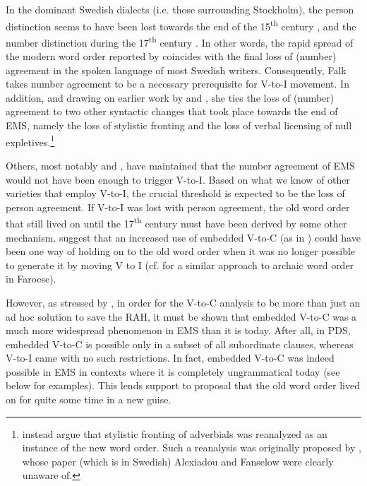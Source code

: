 \documentclass[output=paper]{langscibook}
\begin{document}
In the dominant Swedish dialects (i.e. those surrounding Stockholm), the person distinction seems to have been lost towards the end of the 15\textsuperscript{th} century \citep{Neuman1925}, and the number distinction during the 17\textsuperscript{th} century \citep{Larsson1988}. In other words, the rapid spread of the modern word order reported by \citet{Falk1993} coincides with the final loss of (number) agreement in the spoken language of most Swedish writers. Consequently, Falk takes number agreement to be a necessary prerequisite for V-to-I movement. In addition, and drawing on earlier work by \citet{Platzack1985} and \citet{PlatzackHolmberg1989}, she ties the loss of (number) agreement to two other syntactic changes that took place towards the end of EMS, namely the loss of stylistic fronting and the loss of verbal licensing of null expletives.\footnote{\citet{AlexiadouFanselow2002} instead argue that stylistic fronting of adverbials was reanalyzed as an instance of the new word order. Such a reanalysis was originally proposed by \citet{Pettersson1988}, whose paper (which is in Swedish) Alexiadou and Fanselow were clearly unaware of.} 



Others, most notably \citet{Rohrbacher1999} and \citet{KoenemanZeijlstra2014}, have maintained that the number agreement of EMS would not have been enough to trigger V-to-I. Based on what we know of other varieties that employ V-to-I, the crucial threshold is expected to be the loss of person agreement. If V-to-I was lost with person agreement, the old word order that still lived on until the 17\textsuperscript{th} century must have been derived by some other mechanism. \citet{KoenemanZeijlstra2014} suggest that an increased use of embedded V-to-C (as in ) could have been one way of holding on to the old word order when it was no longer possible to generate it by moving V to I (cf. \citealt{HeycockEtAl2010} for a similar approach to archaic word order in Faroese).



However, as stressed by \citet{Gartner2019}, in order for the V-to-C analysis to be more than just an ad hoc solution to save the RAH, it must be shown that embedded V-to-C was a much more widespread phenomenon in EMS than it is today. After all, in PDS, embedded V-to-C is possible only in a subset of all subordinate clauses, whereas V-to-I came with no such restrictions. In fact, embedded V-to-C was indeed possible in EMS in contexts where it is completely ungrammatical today (see  below for examples). This lends support to  proposal that the old word order lived on for quite some time in a new guise.
\end{document}
